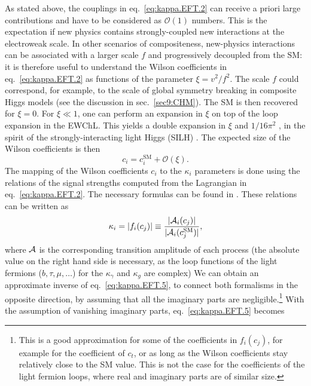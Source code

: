 As stated above, the couplings in eq.~\eqref{eq:kappa.EFT.2} can receive a priori large contributions and have to be considered as $\mathcal{O}(1)$ numbers. This is the expectation if new physics contains strongly-coupled new interactions at the electroweak scale. In other scenarios of compositeness, new-physics interactions  can be associated with a larger scale $f$ and progressively decoupled from the SM: it is therefore useful to understand the Wilson coefficients in eq.~\eqref{eq:kappa.EFT.2} as functions of the parameter $\xi = v^{2}/f^{2}$. The scale $f$ could correspond, for example, to the scale of global symmetry breaking in composite Higgs models (see the discussion in sec.~\ref{sec9:CHM}). The SM is then recovered for $\xi=0$. For $\xi\ll 1$, one can perform an expansion in $\xi$ on top of the loop expansion in the EWChL. This yields a double expansion in $\xi$ and $1/16\pi^{2}$ \cite{Buchalla:2014eca}, in the spirit of the strongly-interacting light Higgs (SILH) \cite{Giudice:2007fh}. The expected size of the Wilson coefficients is then
\begin{equation}
  \label{eq:kappa.EFT.4}
    c_{i} =  c_{i}^{\text{SM}} + \mathcal{O}(\xi).
\end{equation}
The mapping of the Wilson coefficients $c_{i}$ to the $\kappa_{i}$ parameters is done using the relations of the signal strengths computed from the Lagrangian in eq.~\eqref{eq:kappa.EFT.2}. The necessary formulas can be found in \cite{Buchalla:2015qju,deBlas:2018tjm}. These relations can be written as
%
\begin{equation}
\label{eq:kappa.EFT.5}
  \kappa_{i} =  |f_i(c_{j})| \equiv \frac{|{\cal A}_i(c_{j})|}{|{\cal A}_i(c_{j}^{\text{SM}})|}, 
\end{equation}
%
where ${\cal A}$ is the corresponding transition amplitude of each process (the absolute value on the right hand side is necessary, as the loop functions of the light fermions ($b,\tau,\mu,\dots$) for the $\kappa_{\gamma}$ and $\kappa_{g}$ are complex)
We can  obtain an approximate inverse of eq.~\eqref{eq:kappa.EFT.5}, to connect both formalisms in the opposite direction, by assuming that all the imaginary parts are negligible.\footnote{This is a good approximation for some of the coefficients in $f_i(c_{j})$, for example for the coefficient of $c_{t}$, or as long as  the Wilson coefficients stay relatively close to the SM value. This is not the case for the coefficients of the light fermion loops, where real and imaginary parts are of similar size.}
With the assumption of vanishing imaginary parts, eq.~\eqref{eq:kappa.EFT.5} becomes
